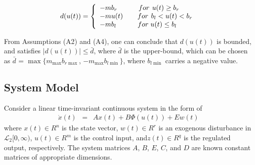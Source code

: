 \documentclass[journal,onecolumn]{IEEEtran}
\begin{document}
\begin{equation}
\label{Eq:deadzone model 3}
\begin{array}{rcl}
\ d(u(t)) = \left\{
\begin{array}{l}
  - m{b_r}{\kern 1pt} {\kern 1pt} {\kern 1pt} {\kern 1pt} {\kern 1pt} {\kern 1pt} {\kern 1pt} {\kern 1pt} {\kern 1pt} {\kern 1pt} {\kern 1pt} {\kern 1pt} {\kern 1pt} {\kern 1pt} {\kern 1pt} {\kern 1pt} {\kern 1pt} {\kern 1pt} {\kern 1pt} {\kern 1pt} {\kern 1pt} {\kern 1pt} {\kern 1pt} {\kern 1pt} {\kern 1pt} {\kern 1pt} {\kern 1pt} {\kern 1pt} {\kern 1pt} {\kern 1pt} {\kern 1pt} for{\kern 1pt} {\kern 1pt} {\kern 1pt} {\kern 1pt} u(t) \ge {b_r} \\
  - mu(t){\kern 1pt} {\kern 1pt} {\kern 1pt} {\kern 1pt} {\kern 1pt} {\kern 1pt} {\kern 1pt} {\kern 1pt} {\kern 1pt} {\kern 1pt} {\kern 1pt} {\kern 1pt} {\kern 1pt} {\kern 1pt} {\kern 1pt} {\kern 1pt} {\kern 1pt} {\kern 1pt} {\kern 1pt} {\kern 1pt} {\kern 1pt} for{\kern 1pt} {\kern 1pt} {\kern 1pt} {\kern 1pt} {b_l} < u(t) < {b_r} \\
  - m{b_l}{\kern 1pt} {\kern 1pt} {\kern 1pt} {\kern 1pt} {\kern 1pt} {\kern 1pt} {\kern 1pt} {\kern 1pt} {\kern 1pt} {\kern 1pt} {\kern 1pt} {\kern 1pt} {\kern 1pt} {\kern 1pt} {\kern 1pt} {\kern 1pt} {\kern 1pt} {\kern 1pt} {\kern 1pt} {\kern 1pt} {\kern 1pt} {\kern 1pt} {\kern 1pt} {\kern 1pt} {\kern 1pt} {\kern 1pt} {\kern 1pt} {\kern 1pt} {\kern 1pt} {\kern 1pt} {\kern 1pt} for{\kern 1pt} {\kern 1pt} {\kern 1pt} u(t) \le {b_l}{\kern 1pt}  \\
 \end{array} \right.\
\end{array}
\end{equation}

From Assumptions (A2) and (A4), one can conclude that $d(u(t))$ is
bounded, and satisfies $\left| {d(u(t))} \right| \le \bar d$, where
$\bar d$  is the upper-bound, which can be chosen as $\bar d$ =
$\max \{ {m_{\max }}{b_{r\max }}$,  $-{m_{\max }}{b_{l\min }}\} $,
where $b_{l\min }$ carries a negative value.







\subsection{System Model}


Consider a linear time-invariant continuous system in the form of
\begin{equation}
\label{Eq:deadzone system}
\begin{array}{rcl}
   \dot{x}(t) &=& Ax(t)+B\Phi (u(t))+Ew(t)


\end{array}
\end{equation}
 where $x(t)\in R^n$ is the state vector,
$w(t)\in R^r$ is an exogenous disturbance in $\mathcal
{L}_2[0,\infty)$, $u(t)\in R^m$ is the control input, and$z(t)\in R
^q$ is the regulated output, respectively. The system matrices $A$,
$B$, $E$, $C$, and $D$ are known constant matrices of appropriate
dimensions.
\end{document}
